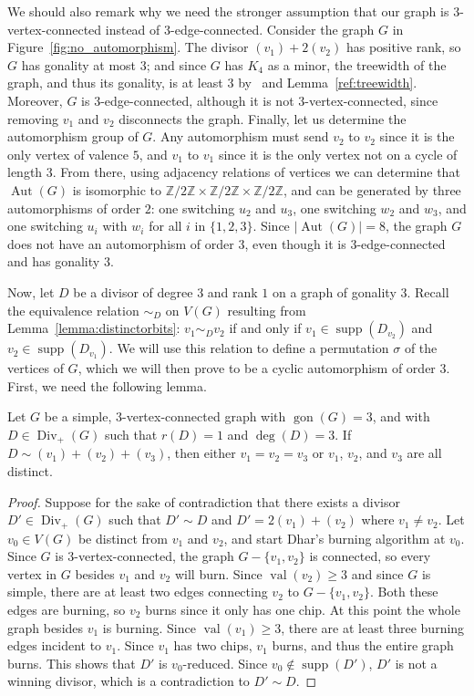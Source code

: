 \documentclass[ALCO,ThmDefs,Unicode,epreuves]{cedram}
\DeclareMathOperator{\gon}{gon}
\DeclareMathOperator{\val}{val}
\DeclareMathOperator{\Aut}{Aut}
\DeclareMathOperator{\Div}{Div}
\DeclareMathOperator{\supp}{supp}
\begin{document}
We should also remark why we need the stronger assumption that our graph is $3$-vertex-connected instead of $3$-edge-connected. Consider the graph $G$ in Figure~\ref{fig:no_automorphism}. The divisor $(v_1)+2(v_2)$ has positive rank, so $G$ has gonality at most $3$; and since $G$ has $K_4$ as a minor, the treewidth of the graph, and thus its gonality, is at least $3$ by~\cite{bod} and Lemma~\ref{ref:treewidth}. Moreover, $G$ is $3$-edge-connected, although it is not $3$-vertex-connected, since removing $v_1$ and $v_2$ disconnects the graph. Finally, let us determine the automorphism group of $G$. Any automorphism must send $v_2$ to $v_2$ since it is the only vertex of valence $5$, and $v_1$ to $v_1$ since it is the only vertex not on a cycle of length $3$. From there, using adjacency relations of vertices we can determine that $\Aut (G)$ is isomorphic to $\mathbb{Z}/2\mathbb{Z}\times \mathbb{Z}/2\mathbb{Z}\times \mathbb{Z}/2\mathbb{Z}$, and can be generated by three automorphisms of order $2$: one switching $u_2$ and $u_3$, one switching $w_2$ and $w_3$, and one switching $u_i$ with $w_i$ for all $i$ in $\{1,2,3\}$. Since $|\Aut (G)|=8$, the graph $G$ does not have an automorphism of order $3$, even though it is $3$-edge-connected and has gonality $3$.


Now, let $D$ be a divisor of degree 3 and rank $1$ on a graph of gonality $3$. Recall the equivalence relation $\sim_D$ on $V(G)$ resulting from Lemma~\ref{lemma:distinctorbits}: $v_1 \sim_D v_2$ if and only if $v_1 \in \supp (D_{v_2})$ and $v_2 \in \supp (D_{v_1})$. We will use this relation to define a permutation $\sigma$ of the vertices of $G$, which we will then prove to be a cyclic automorphism of order $3$. First, we need the following lemma.

\begin{lemma}
\label{lemma:1or3} Let $G$ be a simple, $3$-vertex-connected graph  with $\gon (G) = 3$, and with $D \in \Div _+(G)$ such that $r(D) = 1$ and $\deg (D) = 3$.
If $D\sim (v_1)+(v_2)+(v_3)$, then either $v_1=v_2=v_3$ or $v_1$, $v_2$, and $v_3$ are all distinct.
\end{lemma}


\begin{proof}
Suppose for the sake of contradiction that there exists a divisor $D' \in \Div _+(G)$ such that $D' \sim D$ and $D' = 2(v_1) + (v_2)$ where $v_1 \neq v_2$. Let $v_0\in V(G)$ be distinct from $v_1$ and $v_2$, and start Dhar's burning algorithm at $v_0$. Since $G$ is $3$-vertex-connected, the graph $G-\{v_1,v_2\}$ is connected, so every vertex in $G$ besides $v_1$ and $v_2$ will burn. Since $\val(v_2)\geq 3$ and since $G$ is simple, there are at least two edges connecting $v_2$ to $G-\{v_1,v_2\}$. Both these edges are burning, so $v_2$ burns since it only has one chip. At this point the whole graph besides $v_1$ is burning. Since $\val(v_1)\geq 3$, there are at least three burning edges incident to $v_1$. Since $v_1$ has two chips, $v_1$ burns, and thus the entire graph burns. This shows that $D'$ is $v_0$-reduced. Since $v_0 \notin \supp (D')$, $D'$ is not a winning divisor, which is a contradiction to $D' \sim D$.
\end{proof}
\end{document}
